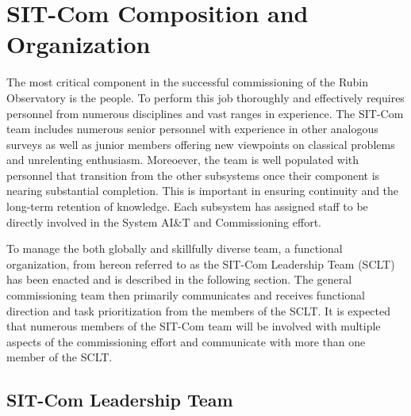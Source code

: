 \documentclass[SE,lsstdraft,authoryear,toc]{lsstdoc}
\begin{document}
\section{SIT-Com Composition and Organization}
\label{sec:comp_and_org}

The most critical component in the successful commissioning of the Rubin Observatory is the people.
To perform this job thoroughly and effectively requires personnel from numerous disciplines and vast ranges in experience.
The SIT-Com team includes numerous senior personnel with experience in other analogous surveys as well as junior members offering new viewpoints on classical problems and unrelenting enthusiasm.
Moreoever, the team is well populated with personnel that transition from the other subsystems once their component is nearing substantial completion.
This is important in ensuring continuity and the long-term retention of knowledge.
Each subsystem has assigned staff to be directly involved in the System AI\&T and Commissioning effort.

To manage the both globally and skillfully diverse team, a functional organization, from hereon referred to as the SIT-Com Leadership Team (SCLT) has been enacted and is described in the following section.
The general commissioning team then primarily communicates and receives functional direction and task prioritization from the members of the SCLT.
It is expected that numerous members of the SIT-Com team will be involved with multiple aspects of the commissioning effort and communicate with more than one member of the SCLT.
%



\subsection{SIT-Com Leadership Team}
\label{sec:SCLT}
\end{document}

